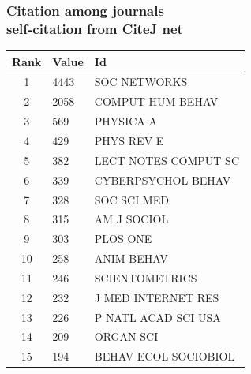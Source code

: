 \documentclass[hyperref={pdfstartview={FitBH -32768},
                         pdfpagemode=FullScreen,
                         plainpages=false,
                         colorlinks=true}
              ]{beamer}
\begin{document}
\begin{frame}[fragile]
\frametitle{Citation among journals\\ \normalsize self-citation from CiteJ net}

\renewcommand{\arraystretch}{0.95}
\footnotesize
\begin{center}
\begin{tabular}{c|l|l} 
 Rank       &        Value   & Id		    \\ \hline 
         1  &    4443   & SOC NETWORKS		    \\
         2  &    2058   & COMPUT HUM BEHAV	    \\
         3  &     569   & PHYSICA A		    \\
         4  &     429   & PHYS REV E		    \\
         5  &     382   & LECT NOTES COMPUT SC	    \\
         6  &     339   & CYBERPSYCHOL BEHAV	    \\
         7  &     328   & SOC SCI MED		    \\
         8  &     315   & AM J SOCIOL		    \\
         9  &     303   & PLOS ONE		    \\
        10  &     258   & ANIM BEHAV		    \\
        11  &     246   & SCIENTOMETRICS	    \\
        12  &     232   & J MED INTERNET RES	    \\
        13  &     226   & P NATL ACAD SCI USA	    \\
        14  &     209   & ORGAN SCI		    \\
        15  &     194    & BEHAV ECOL SOCIOBIOL	     \\ \hline 
\end{tabular} 
\end{center}

\end{frame}
\end{document}
